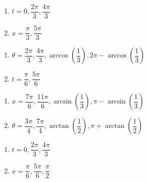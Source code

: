 \documentclass{ximera}
\begin{document}
\begin{multicols}{2}

\begin{enumerate}

\setcounter{enumi}{\value{HW}}

\item $t = 0, \dfrac{2\pi}{3}, \dfrac{4\pi}{3}$
\item  $x=\dfrac{\pi}{3}, \dfrac{5\pi}{3}$

\setcounter{HW}{\value{enumi}}

\end{enumerate}

\end{multicols}

\begin{multicols}{2}

\begin{enumerate}

\setcounter{enumi}{\value{HW}}

\item  $\theta = \dfrac{2\pi}{3}, \dfrac{4\pi}{3}, \arccos\left(\dfrac{1}{3}\right), 2\pi -\arccos\left(\dfrac{1}{3}\right) $
\item  $t=\dfrac{\pi}{6}, \dfrac{5\pi}{6}$

\setcounter{HW}{\value{enumi}}

\end{enumerate}

\end{multicols}

\begin{multicols}{2}

\begin{enumerate}

\setcounter{enumi}{\value{HW}}

\item  $x = \dfrac{7\pi}{6}, \dfrac{11\pi}{6}, \arcsin\left(\dfrac{1}{3}\right), \pi - \arcsin\left(\dfrac{1}{3}\right) $
\item  $\theta=\dfrac{3\pi}{4}, \dfrac{7\pi}{4}, \arctan\left(\dfrac{1}{2}\right), \pi +\arctan\left(\dfrac{1}{2}\right) $

\setcounter{HW}{\value{enumi}}

\end{enumerate}

\end{multicols}

\begin{multicols}{2}

\begin{enumerate}

\setcounter{enumi}{\value{HW}}

\item  $t=0, \dfrac{2\pi}{3}, \dfrac{4\pi}{3}$
\item  $x=\dfrac{\pi}{6}, \dfrac{5\pi}{6}, \dfrac{\pi}{2}$

\setcounter{HW}{\value{enumi}}

\end{enumerate}

\end{multicols}
\end{document}
